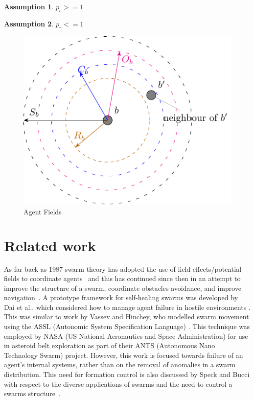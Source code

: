 \documentclass[12pt,a4paper]{IEEEtran}
\newtheorem{assumption}{Assumption}
\begin{document}
\begin{assumption}
	$p_c >= 1$
\end{assumption}
\begin{assumption}
	$p_r <= 1$
\end{assumption}
\begin{figure}[H]
	\centering
	\includegraphics[width=0.8\linewidth]{figures/stableswarm}
	\caption[Agent Fields]{Agent Fields}
	\label{fig:stableswarm}
\end{figure}

\section{Related work}

As far back as 1987 swarm theory has adopted the use of field effects/potential fields to coordinate agents~\cite{REY:87} and this has continued since then in an attempt to improve the structure of a swarm, coordinate obstacles avoidance, and improve navigation~\cite{BAFVM:06,BAF:06,BFV:07,BM:09,eliot2018metric,VG:05,HC:09,SW:03,Son2017}. A prototype framework for self-healing swarms was developed by Dai et al., which considered how to manage agent failure in hostile environments \cite{DHMRZ:06}. This was similar to work by Vassev and Hinchey, who modelled swarm movement using the ASSL (Autonomic System Specification Language) \cite{VH:09}. This technique was employed by NASA (US National Aeronautics and Space Administration) for use in asteroid belt exploration as part of their ANTS (Autonomous Nano Technology Swarm) project. However, this work is focused towards failure of an agent's internal systems, rather than on the removal of anomalies in a swarm distribution. This need for formation control is also discussed by Speck and Bucci with respect to the diverse applications of swarms and the need to control a swarms structure~\cite{8430773}.
\end{document}
